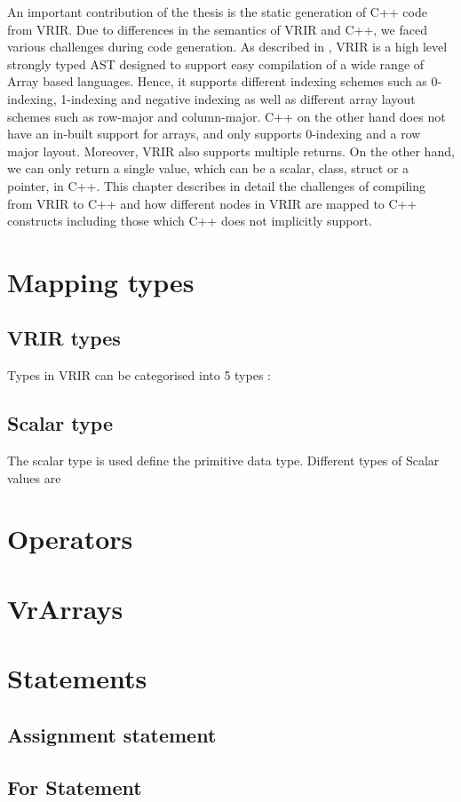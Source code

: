 An important contribution of the thesis is the static generation of C++ code from VRIR. Due to differences in the semantics of VRIR and C++, we faced various challenges during code generation. As described in , VRIR is a high level strongly typed AST designed to support easy compilation of a wide range of Array based languages. Hence, it supports different indexing schemes such as 0-indexing, 1-indexing and negative indexing as well as different array layout schemes such as row-major and column-major. C++ on the other hand does not have an in-built support for arrays, and only supports 0-indexing and a row major layout. Moreover, VRIR also supports multiple returns. On the other hand, we can only return a single value, which can be a scalar, class, struct or a pointer, in C++. This chapter describes in detail the challenges of compiling from VRIR to C++ and  how different nodes in VRIR are mapped to C++ constructs including those which C++ does not implicitly support.
\section{Mapping types}
\subsection{VRIR types}
Types in VRIR can be categorised into 5 types :
\subsection{Scalar type}
The scalar type is used define the primitive data type.
Different types of Scalar values are 
\section{Operators}
\section{VrArrays}
\section{Statements}
\subsection{Assignment statement}
\subsection{For Statement}
